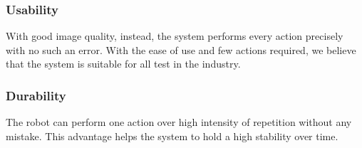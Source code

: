 \subsubsection{Usability}
With good image quality, instead, the system performs every action precisely with no such an error. With the ease of use and few actions required, we believe that the system is suitable for all test in the industry.

\subsubsection{Durability}
The robot can perform one action over high intensity of repetition without any mistake. This advantage helps the system to hold a high stability over time.
